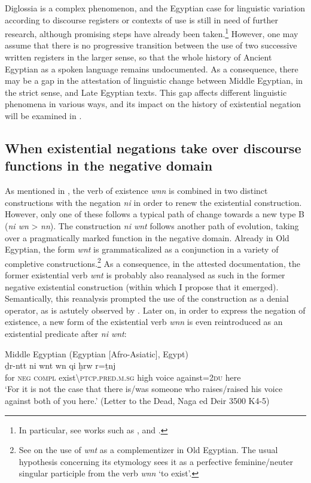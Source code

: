 \documentclass[output=paper,draft,draftmode,colorlinks,citecolor=brown]{langscibook}
\begin{document}
Diglossia is a complex phenomenon, and the Egyptian case for linguistic variation according to discourse registers or contexts of use is still in need of further research, although promising steps have already been taken.\footnote{In particular, see works such as \citet{Stauder2014a}, \citet{Werning2013} and \citet{Polis2017}.} 
However, one may assume that there is no progressive transition between the use of two successive written registers in the larger sense, so that the whole history of Ancient Egyptian as a spoken language remains undocumented. As a consequence, there may be a gap in the attestation of linguistic change between Middle Egyptian, in the strict sense, and Late Egyptian texts. This gap affects different linguistic phenomena in various ways, and its impact on the history of existential negation will be examined in .

\subsection{When existential negations take over discourse functions in the negative domain}\label{s:AE3-2}

As mentioned in , the verb of existence \textit{wnn} is combined in two distinct constructions with the negation \textit{ni} in order to renew the existential construction. However, only one of these follows a typical path of change towards a new type B (\textit{ni wn} > \textit{nn}). The construction \textit{ni wnt} follows another path of evolution, taking over a pragmatically marked function in the negative domain. Already in Old Egyptian, the form \textit{wnt} is grammaticalized as a conjunction in a variety of completive constructions.\footnote{See \citet{Uljas2007} on the use of \textit{wnt} as a complementizer in Old Egyptian. The usual hypothesis concerning its etymology sees it as a perfective feminine/neuter singular participle from the verb \textit{wnn} ‘to exist’.}
As a consequence, in the attested documentation, the former existential verb \textit{wnt} is probably also reanalysed as such in the former negative existential construction (within which I propose that it emerged). Semantically, this reanalysis prompted the use of the construction as a denial operator, as is astutely observed by \citet[192–193]{Uljas2007}. Later on, in order to express the negation of existence, a new form of the existential verb \textit{wnn} is even reintroduced as an existential predicate after \textit{ni wnt}: 
 
\ea Middle Egyptian (Egyptian [Afro-Asiatic], Egypt) \label{ex:AE47}\\
    \gll ḏr-ntt ni wnt wn q{\ꜣ}i ḫrw r=ṯnj {\ꜥ}{\ꜣ}\\
    for \textsc{neg} \textsc{compl} exist\textbackslash\textsc{ptcp.pred.m.sg} high voice against=\textsc{2du} here\\ 
    \glt ‘For it is not the case that there is/was someone who raises/raised his voice against both of you here.’ (Letter to the Dead, Naga ed Deir 3500 K4-5) 
\z
 
\end{document}
